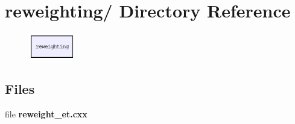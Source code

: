 \section{reweighting/ Directory Reference}
\label{dir_ab5941e0da360baadcf98f62e420adcf}


\begin{figure}[H]
\begin{center}
\leavevmode
\includegraphics[width=57pt]{dir_ab5941e0da360baadcf98f62e420adcf_dep}
\end{center}
\end{figure}
\subsection*{Files}
\begin{CompactItemize}
\item 
file \textbf{reweight\_\-et.cxx}
\end{CompactItemize}
